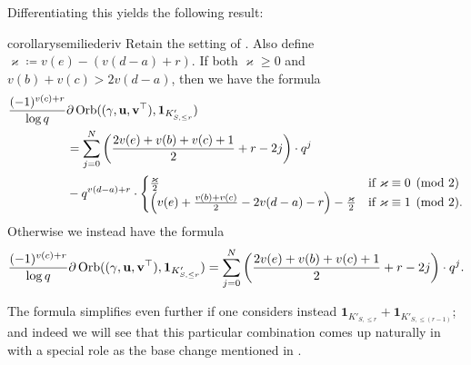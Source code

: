 Differentiating this yields the following result:
\begin{restatable}[Derivative at $s=0$ for $S_2(F) \times V'_2(F)$]{corollary}{semiliederiv}
  \label{cor:semi_lie_derivative_single}
  Retain the setting of .
  Also define $\varkappa \coloneqq v(e) - (v(d-a)+r)$.
  If both $\varkappa \ge 0$ and $v(b) + v(c) > 2v(d-a)$, then we have the formula
  \begin{align*}
    \frac{(-1)^{v(c)+r}}{\log q}
    &\partial \operatorname{Orb}({(\gamma, \mathbf u, \mathbf v^\top)}, \mathbf{1}_{K'_{S, \le r}}) \\
    &= \sum_{j=0}^N \left( \frac{2v(e)+v(b)+v(c)+1}{2} + r - 2j \right) \cdot q^j \\
    & - q^{v(d-a)+r} \cdot
    \begin{cases}
      \frac{\varkappa}{2} & \text{if }\varkappa \equiv 0 \pmod 2 \\
      \left( v(e)+\frac{v(b)+v(c)}{2}-2v(d-a)-r \right) - \frac{\varkappa}{2}
      & \text{if }\varkappa \equiv 1 \pmod 2.
    \end{cases}
  \end{align*}
  Otherwise we instead have the formula
  \[
    \frac{(-1)^{v(c)+r}}{\log q}
    \partial \operatorname{Orb}({(\gamma, \mathbf u, \mathbf v^\top)}, \mathbf{1}_{K'_{S, \le r}}) \\
    = \sum_{j=0}^N \left( \frac{2v(e)+v(b)+v(c)+1}{2} + r - 2j \right) \cdot q^j.
  \]
\end{restatable}

The formula simplifies even further if one considers instead
$\mathbf{1}_{K'_{S, \le r}} + \mathbf{1}_{K'_{S, \le (r-1)}}$;
and indeed we will see that this particular combination
comes up naturally in  with a special role
as the base change mentioned in \cite[Lemma 7.1.1]{ref:AFLspherical}.

